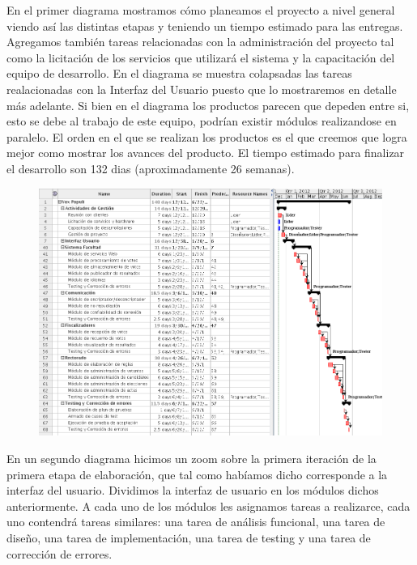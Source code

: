 \par

En el primer diagrama mostramos cómo planeamos el proyecto a nivel general viendo así las distintas etapas y teniendo un tiempo estimado para las entregas. Agregamos tambi\'en tareas relacionadas con la administración del proyecto tal como la licitaci\'on de los servicios que utilizará el sistema y la capacitación del equipo de desarrollo. En el diagrama se muestra colapsadas las tareas realacionadas con la Interfaz del Usuario puesto que lo mostraremos en detalle más adelante. Si bien en el diagrama los productos parecen que depeden entre si, esto se debe al trabajo de este equipo, podrían existir módulos realizandose en paralelo. El orden en el que se realizan los productos es el que creemos que logra mejor como mostrar los avances del producto. El tiempo estimado para finalizar el desarrollo son 132 dias (aproximadamente 26 semanas).	

\par
\begin{figure}[H]
\begin{center}
\includegraphics[scale=0.6]{./imagenes/gantintegral.png}
\end{center}
\end{figure}

\par
En un segundo diagrama hicimos un zoom sobre la primera iteración de la primera etapa de elaboración, que tal como habíamos dicho corresponde a la interfaz del usuario. Dividimos la interfaz de usuario en los m\'odulos dichos anteriormente. A cada uno de los m\'odulos les asignamos tareas a realizarce, cada uno contendrá tareas similares: una tarea de an\'alisis funcional, una tarea de diseño, una tarea de implementaci\'on, una tarea de testing y una tarea de correcci\'on de errores.

